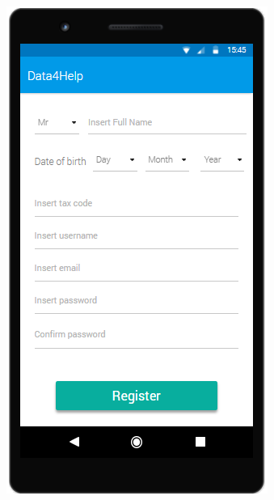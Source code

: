 \begin{figure}[H]
\begin{minipage}{.5\textwidth}
  \includegraphics[width=0.89\linewidth]{resources/Screen/RegistrationIndividual.png}
  \label{fig:App Registration}
\end{minipage}
\end{figure}


